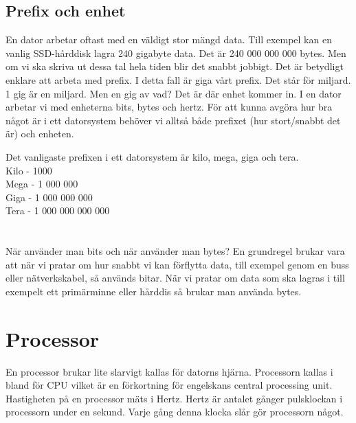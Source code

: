 \documentclass[12pt, letterpaper]{report}
\begin{document}
\section{Prefix och enhet}
En dator arbetar oftast med en väldigt stor mängd data. Till exempel kan en vanlig SSD-hårddisk lagra 240 gigabyte data. Det är 240 000 000 000 bytes. Men om vi ska skriva ut dessa tal hela tiden blir det snabbt jobbigt. Det är betydligt enklare att arbeta med prefix. I detta fall är giga vårt prefix. Det står för miljard. 1 gig är en miljard. Men en gig av vad? Det är där enhet kommer in. I en dator arbetar vi med enheterna bits, bytes och hertz. För att kunna avgöra hur bra något är i ett datorsystem behöver vi alltså både prefixet (hur stort/snabbt det är) och enheten. 

Det vanligaste prefixen i ett datorsystem är kilo, mega, giga och tera.\\
Kilo - 1000\\
Mega - 1 000 000\\
Giga - 1 000 000 000\\
Tera - 1 000 000 000 000\\\\\\

När använder man bits och när använder man bytes? En grundregel brukar vara att när vi pratar om hur snabbt vi kan förflytta data, till exempel genom en buss eller nätverkskabel, så används bitar. När vi pratar om data som ska lagras i till exempelt ett primärminne eller hårddis så brukar man använda bytes. 

\chapter{Processor}
En processor brukar lite slarvigt kallas för datorns hjärna. Processorn kallas i bland för CPU vilket är en förkortning för engelskans central processing unit. Hastigheten på en processor mäts i Hertz. Hertz är antalet gånger pulsklockan i processorn under en sekund. Varje gång denna klocka slår gör processorn något. 
\end{document}
